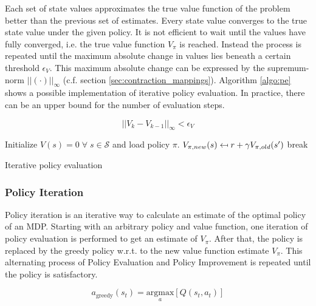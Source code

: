 Each set of state values approximates the true value function of the problem better than the previous set of estimates. Every state value converges to the true state value under the given policy. It is not efficient to wait until the values have fully converged, i.e. the true value function $V_\pi$ is reached. Instead the process is repeated until the maximum absolute change in values lies beneath a certain threshold $\epsilon_V$. This maximum absolute change can be expressed by the supremum-norm $||(\cdot)||_\infty$ (c.f. section \ref{sec:contraction_mappings}). Algorithm \ref{algo:pe} shows a possible implementation of iterative policy evaluation. In practice, there can be an upper bound for the number of evaluation steps.

\begin{equation}
||V_{k}-V_{k-1}||_\infty<\epsilon_V
\label{eq:pe_stopping_criterion}
\end{equation}

\begin{algorithm}[hbt]
	
	\begin{algorithmic}[0] %
		
		\State Initialize $V(s) = 0 \; \forall \; s \in \mathcal{S}$ and load policy $\pi$.
		\State $V_{\pi,new}(s) \mathrel{\reflectbox{\ensuremath{\mapsto}}} r+\gamma V_ {\pi,old}(s')$
		\EndFor
		\State break
		\EndIf
		\EndWhile
		\EndFunction
	\end{algorithmic}
	\caption{Iterative policy evaluation}
	\label{algo:pe}
\end{algorithm}

\subsubsection{Policy Iteration}
\label{sec:PI}
Policy iteration is an iterative way to calculate an estimate of the optimal policy of an MDP. Starting with an arbitrary policy and value function, one iteration of policy evaluation is performed to get an estimate of $V_\pi$. After that, the policy is replaced by the greedy policy w.r.t. to the new value function estimate $V_\pi$. This alternating process of Policy Evaluation and Policy Improvement is repeated until the policy is satisfactory.

\begin{equation}
a_{\text{greedy}}(s_t) = \underset{a}{\text{argmax}}[Q(s_t,a_t)]
\label{eq:get_greedy_action}
\end{equation}

